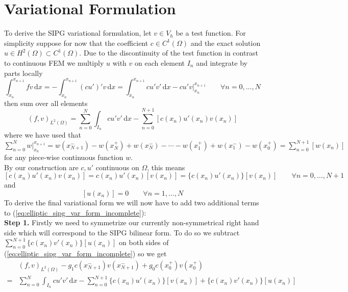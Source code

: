 \section{Variational Formulation}
To derive the SIPG variational formulation, let $v \in V_h$ be a test
function. For simplicity suppose for now that the coefficient $c \in C^1(\Omega)$ and
the exact solution $u \in H^2(\Omega) \subset C^1(\Omega)$.
Due to the discontinuity of the test function in contrast to
continuous FEM we multiply $u$ with $v$ on each element $I_n$
and integrate by parts locally
\begin{equation*}
	\int_{x_n}^{x_{n+1}} fv\, \text{d}x = -\int_{x_n}^{x_{n+1}} (cu')'v\, \text{d}x
	= \int_{x_n}^{x_{n+1}} cu'v'\, \text{d}x
	-  cu'v\Big|_{x_n}^{x_{n+1}} \qquad \forall n=0,\ldots,N
\end{equation*}
then sum over all elements
\begin{equation}
	\label{eq:elliptic_sipg_var_form_incomplete}
	(f,v)_{L^2(\Omega)} = \sum_{n=0}^N \int_{I_n} cu'v'\, \text{d}x
	-\sum_{n=0}^{N+1} [c(x_n)u'(x_n)v(x_n)]
\end{equation}
where we have used that $\sum_{n=0}^N  w \Big|_{x_n}^{x_{n+1}} = w(x_{N+1}^-) -
	w(x_{N}^+) + w(x_{N}^-) - \cdots - w(x_1^+) + w(x_1^-) - w(x_0^+) = \sum_{n=0}^{N+1} [w(x_n)]$ for any piece-wise continuous function $w$.
\\
By our construction are $c, u'$ continuous on $\Omega$, this means
\begin{equation}
	\label{eq:id_1_cu_jump_zero}
	[c(x_n)u'(x_n)v(x_n)] = c(x_n)u'(x_n)[v(x_n)] = \{c(x_n)u'(x_n)\}[v(x_n)] \qquad \forall n=0,\ldots,N+1
\end{equation}
and
\begin{equation}
	\label{eq:id_2_u_jump_zero}
	[u(x_n)] = 0 \qquad \forall n=1,\ldots,N
\end{equation}
To derive the final variational form we will now have to add two additional terms
to (\ref{eq:elliptic_sipg_var_form_incomplete}): \\
\textbf{Step 1.} Firstly we need to symmetrize our currently non-symmetrical right hand side
which will correspond to the SIPG bilinear form. To do so
we subtract $\sum_{n=0}^{N+1} \{c(x_n)v'(x_n)\}[u(x_n)]$ on both sides of
(\ref{eq:elliptic_sipg_var_form_incomplete}) so we get
\begin{align*}
	  & (f,v)_{L^2(\Omega)}-g_1c(x_{N+1}^-)v(x_{N+1}^-) + g_0c(x_0^+)v(x_0^+) \\
	= & \sum_{n=0}^N \int_{I_n} cu'v'\, \text{d}x
	-\sum_{n=0}^{N+1} \{c(x_n)u'(x_n)\}[v(x_n)] + \{c(x_n)v'(x_n)\}[u(x_n)]
\end{align*}

